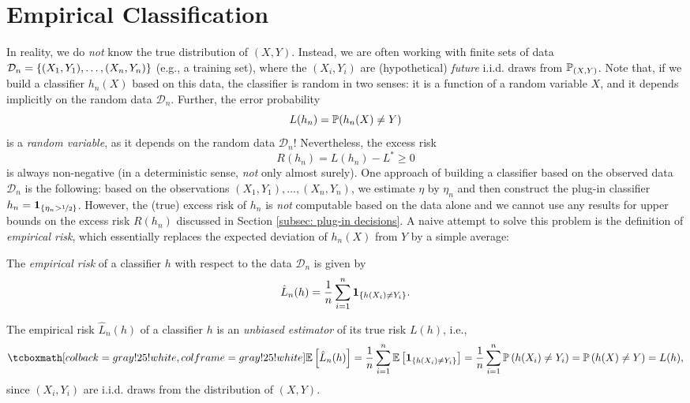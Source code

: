 \section{Empirical Classification}
\label{subsec: empirical classification}

In reality, we do \emph{not} know the true distribution of $(X, Y)$. Instead, we are often working with finite sets of data $\mathcal{D}_n = \set{(X_1, Y_1), \dots, (X_n, Y_n)}$ (e.g., a training set), where the $(X_i, Y_i)$ are (hypothetical) \emph{future} i.i.d. draws from $\P_{(X, Y)}$. Note that, if we build a classifier $h_n(X)$ based on this data, the classifier is random in two senses: it is a function of a random variable $X$, and it depends implicitly on the random data $\mathcal{D}_n$. Further, the error probability
\[
    L(h_n) = \P(h_n (X) \neq Y)
\]
is a \emph{random variable}, as it depends on the random data $\mathcal{D}_n$! Nevertheless, the excess risk
\[
    R(h_n) = L(h_n) - L^* \geq 0
\]
is always non-negative (in a deterministic sense, \emph{not} only almost surely). One approach of building a classifier based on the observed data $\mathcal{D}_n$ is the following: based on the observations $(X_1, Y_1), \dots, (X_n, Y_n)$, we estimate $\eta$ by $\eta_n$ and then construct the plug-in classifier $h_n = \indSet{\eta_n > \nicefrac{1}{2}}$. However, the (true) excess risk of $h_n$ is \emph{not} computable based on the data alone and we cannot use any results for upper bounds on the excess risk $R(h_n)$ discussed in Section \ref{subsec: plug-in decisions}. A naive attempt to solve this problem is the definition of \emph{empirical risk}, which essentially replaces the expected deviation of $h_n(X)$ from $Y$ by a simple average:

\begin{definition}
The \emph{empirical risk} of a classifier $h$ with respect to the data $\mathcal{D}_n$ is given by
\[
    \hat L_n(h) = \frac{1}{n} \sum_{i=1}^n \indSet{h(X_i) \neq Y_i}.
\]
\end{definition}

The empirical risk $\hat L_n(h)$ of a classifier $h$ is an \emph{unbiased estimator} of its true risk $L(h)$, i.e.,
\begin{equation}
\label{eq: bias of empirical risk}
    \highlightMath{
        \Ex{\hat L_n(h)} = \frac{1}{n} \sum_{i=1}^n \Ex{\indSet{h(X_i) \neq Y_i}} = \frac{1}{n} \sum_{i=1}^n \Pr{h(X_i) \neq Y_i} = \Pr{h(X) \neq Y} = L(h),
    }
\end{equation}
since $(X_i, Y_i)$ are i.i.d. draws from the distribution of $(X, Y)$.

